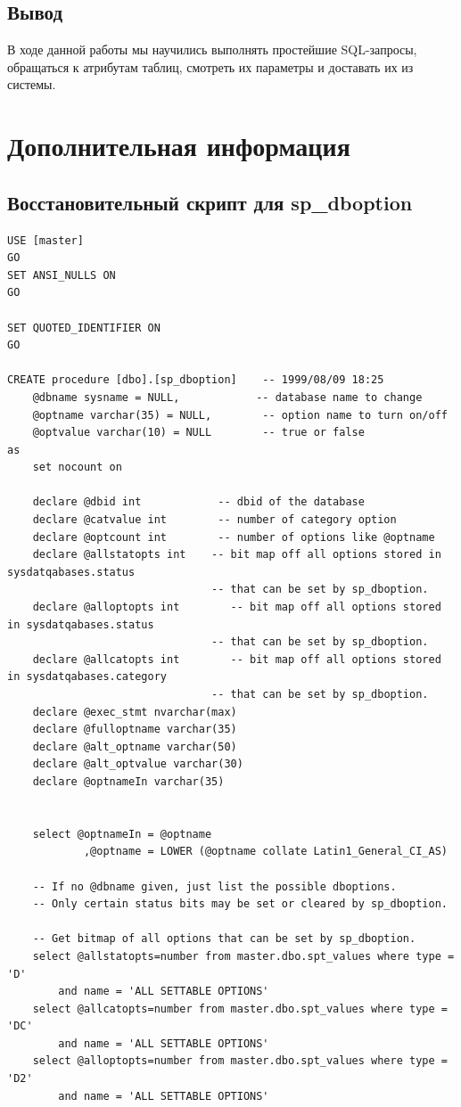 \subsection{Вывод}
В ходе данной работы мы научились выполнять простейшие SQL-запросы, обращаться к атрибутам таблиц, смотреть их параметры и доставать их из системы.
\newpage
\section{Дополнительная информация}
\subsection{\centering Восстановительный скрипт для sp\_dboption}
\label{CODE:sp_dboption}
\begin{verbatim}
USE [master]
GO
SET ANSI_NULLS ON
GO

SET QUOTED_IDENTIFIER ON
GO

CREATE procedure [dbo].[sp_dboption]    -- 1999/08/09 18:25
    @dbname sysname = NULL,            -- database name to change
    @optname varchar(35) = NULL,        -- option name to turn on/off
    @optvalue varchar(10) = NULL        -- true or false
as
    set nocount on
    
    declare @dbid int            -- dbid of the database
    declare @catvalue int        -- number of category option
    declare @optcount int        -- number of options like @optname
    declare @allstatopts int    -- bit map off all options stored in sysdatqabases.status
                                -- that can be set by sp_dboption.
    declare @alloptopts int        -- bit map off all options stored in sysdatqabases.status
                                -- that can be set by sp_dboption.
    declare @allcatopts int        -- bit map off all options stored in sysdatqabases.category
                                -- that can be set by sp_dboption.
    declare @exec_stmt nvarchar(max)
    declare @fulloptname varchar(35)
    declare @alt_optname varchar(50)
    declare @alt_optvalue varchar(30)
    declare @optnameIn varchar(35)


    select @optnameIn = @optname
            ,@optname = LOWER (@optname collate Latin1_General_CI_AS)
            
    -- If no @dbname given, just list the possible dboptions.
    -- Only certain status bits may be set or cleared by sp_dboption.
    
    -- Get bitmap of all options that can be set by sp_dboption.
    select @allstatopts=number from master.dbo.spt_values where type = 'D'
        and name = 'ALL SETTABLE OPTIONS'
    select @allcatopts=number from master.dbo.spt_values where type = 'DC'
        and name = 'ALL SETTABLE OPTIONS'
    select @alloptopts=number from master.dbo.spt_values where type = 'D2'
        and name = 'ALL SETTABLE OPTIONS'


\end{verbatim}
